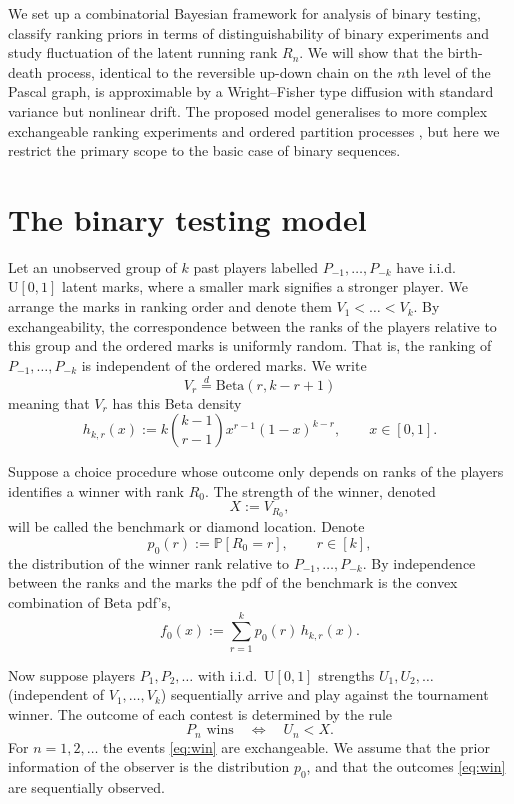 \documentclass[11pt,reqno]{amsart}
\theoremstyle{definition}
\theoremstyle{remark}
\numberwithin{equation}{section}
\begin{document}
We set up a combinatorial Bayesian framework for analysis of binary testing, classify ranking priors in terms of distinguishability of binary experiments and study fluctuation of the latent running rank \(R_n\). We will show that the birth-death process, identical to the reversible up-down chain on the \(n\)th level of the Pascal graph, is approximable by a Wright--Fisher type diffusion with standard variance but nonlinear drift. The proposed model generalises to more complex exchangeable ranking experiments and ordered partition processes \cite{DongGnedinPitman2007,GnedinPitman2005,GnedinPitman2006}, but here we restrict the primary scope to the basic case of binary sequences.

\section{The binary testing model}

Let an unobserved group of \(k\) past players labelled \(P_{-1},\dots,P_{-k}\) have i.i.d.\ \(\mathrm{U}[0,1]\) latent marks, where a smaller mark signifies a stronger player. We arrange the marks in ranking order and denote them \(V_1<\dots<V_k\). By exchangeability, the correspondence between the ranks of the players relative to this group and the ordered marks is uniformly random. That is, the ranking of \(P_{-1},\dots,P_{-k}\) is independent of the ordered marks. We write
\[
V_r\stackrel{d}{=}\mathrm{Beta}(r,k-r+1)
\]
meaning that \(V_r\) has this Beta density
\[
h_{k,r}(x):=k\binom{k-1}{r-1}x^{r-1}(1-x)^{k-r},\qquad x\in[0,1].
\]

Suppose a choice procedure whose outcome only depends on ranks of the players identifies a winner with rank \(R_0\). The strength of the winner, denoted
\[
X:=V_{R_0},
\]
will be called the benchmark or diamond location. Denote
\[
p_0(r):=\mathbb{P}[R_0=r],\qquad r\in[k],
\]
the distribution of the winner rank relative to \(P_{-1},\dots,P_{-k}\). By independence between the ranks and the marks the pdf of the benchmark is the convex combination of Beta pdf's,
\begin{equation}\label{eq:f0}
f_0(x):=\sum_{r=1}^k p_0(r)\,h_{k,r}(x).
\end{equation}

Now suppose players \(P_1,P_2,\dots\) with i.i.d.\ \(\mathrm{U}[0,1]\) strengths \(U_1,U_2,\dots\) (independent of \(V_1,\dots,V_k\)) sequentially arrive and play against the tournament winner. The outcome of each contest is determined by the rule
\begin{equation}\label{eq:win}
P_n\text{ wins}\quad\Longleftrightarrow\quad U_n<X.
\end{equation}
For \(n=1,2,\dots\) the events \eqref{eq:win} are exchangeable. We assume that the prior information of the observer is the distribution \(p_0\), and that the outcomes \eqref{eq:win} are sequentially observed.
\end{document}
